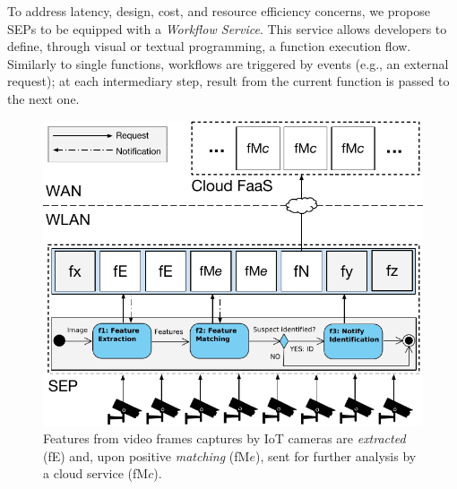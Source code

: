 To address latency, design, cost, and resource efficiency concerns, we propose SEPs to be equipped with a \textit{Workflow Service}. This service allows developers to define, through visual or textual programming, a function execution flow.
Similarly to single functions, workflows are triggered by events (e.g., an external request); at each intermediary step, result from the current function is passed to the next one. 

\begin{figure}[bp]
	\centering
	\includegraphics[width=\linewidth]{Figs/Edge_Data_Analytics_Video_Surveillance.pdf}
	\caption{Features from video frames captures by IoT cameras are \textit{extracted} (fE) and, upon positive \textit{matching} (fM$e$), sent for further analysis by a cloud service (fM$c$).}
	\label{fig:Edge_Data_Analytics_Video_Surveillance}
\end{figure}

